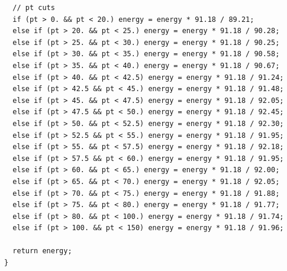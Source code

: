\documentclass[a4paper]{report}
\numberwithin{equation}{section}
\begin{document}
\begin{tcolorbox}
\begin{verbatim}
  // pt cuts
  if (pt > 0. && pt < 20.) energy = energy * 91.18 / 89.21;
  else if (pt > 20. && pt < 25.) energy = energy * 91.18 / 90.28;
  else if (pt > 25. && pt < 30.) energy = energy * 91.18 / 90.25;
  else if (pt > 30. && pt < 35.) energy = energy * 91.18 / 90.58;
  else if (pt > 35. && pt < 40.) energy = energy * 91.18 / 90.67;
  else if (pt > 40. && pt < 42.5) energy = energy * 91.18 / 91.24;
  else if (pt > 42.5 && pt < 45.) energy = energy * 91.18 / 91.48;
  else if (pt > 45. && pt < 47.5) energy = energy * 91.18 / 92.05;
  else if (pt > 47.5 && pt < 50.) energy = energy * 91.18 / 92.45;
  else if (pt > 50. && pt < 52.5) energy = energy * 91.18 / 92.30;
  else if (pt > 52.5 && pt < 55.) energy = energy * 91.18 / 91.95;
  else if (pt > 55. && pt < 57.5) energy = energy * 91.18 / 92.18;
  else if (pt > 57.5 && pt < 60.) energy = energy * 91.18 / 91.95;
  else if (pt > 60. && pt < 65.) energy = energy * 91.18 / 92.00;
  else if (pt > 65. && pt < 70.) energy = energy * 91.18 / 92.05;
  else if (pt > 70. && pt < 75.) energy = energy * 91.18 / 91.88;
  else if (pt > 75. && pt < 80.) energy = energy * 91.18 / 91.77;
  else if (pt > 80. && pt < 100.) energy = energy * 91.18 / 91.74;
  else if (pt > 100. && pt < 150) energy = energy * 91.18 / 91.96;

  return energy;
} 
\end{verbatim}
\end{tcolorbox}
\end{document}
